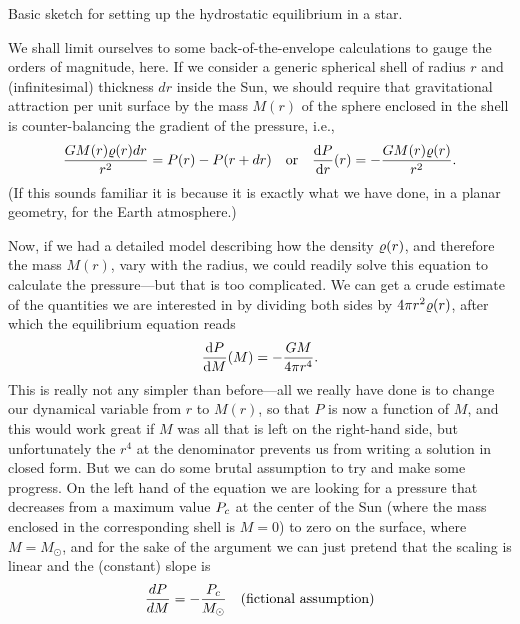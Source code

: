 \begin{marginfigure}
  
  \caption{Basic sketch for setting up the hydrostatic equilibrium in a star.}
\end{marginfigure}

We shall limit ourselves to some back-of-the-envelope calculations to gauge the orders
of magnitude, here. If we consider a generic spherical shell of radius $r$ and
(infinitesimal) thickness $dr$ inside the Sun, we should require that gravitational
attraction per unit surface by the mass $M(r)$ of the sphere enclosed in the shell
is counter-balancing the gradient of the pressure, i.e.,
\begin{align}\label{eq:hydro_equilibrium}
  \frac{G M(r)\varrho(r) dr}{r^2} = P(r) - P(r + dr)
  \quad\text{or}\quad
  \dv{\ensuremath{P}}{r}{(r)} = -\frac{G M(r) \varrho(r)}{r^2}.
\end{align}
(If this sounds familiar it is because it is exactly what we have done, in a planar
geometry, for the Earth atmosphere.)

Now, if we had a detailed model describing how the density $\varrho(r)$,
and therefore the mass $M(r)$, vary with the radius, we could readily solve this
equation to calculate the pressure---but that is too complicated. We can get a
crude estimate of the quantities we are interested in by dividing both sides
by $4\pi r^2 \varrho(r)$, after which the equilibrium equation reads
\begin{align}
  \dv{\ensuremath{P}}{M}{(M)} = -\frac{G M}{4\pi r^4}.
\end{align}
This is really not any simpler than before---all we really have done is to change
our dynamical variable from $r$ to $M(r)$, so that $P$ is now a function of
$M$, and this would work great if $M$ was all that is left on the right-hand side,
but unfortunately the $r^4$ at the denominator prevents us from writing a solution
in closed form. But we can do some brutal assumption to try and make some progress.
On the left hand of the equation we are looking for a pressure that decreases from a
maximum value $P_c$ at the center of the Sun (where the mass enclosed in
the corresponding shell is $M = 0$) to zero on the surface, where $M = M_\odot$, and
for the sake of the argument we can just pretend that the scaling is linear and the
(constant) slope is
\begin{align*}
	\frac{dP}{dM} = -\frac{P_c}{M_\odot} \quad
	\text{(fictional assumption)}
\end{align*}

